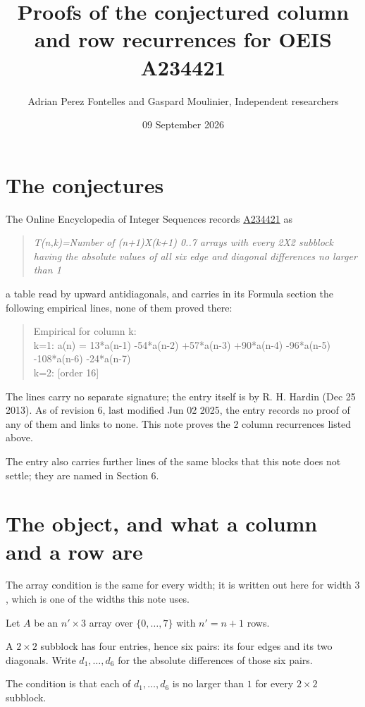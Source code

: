 \documentclass[11pt]{article}
\title{Proofs of the conjectured column and row recurrences for OEIS A234421}
\author{Adrian Perez Fontelles and Gaspard Moulinier, Independent researchers}
\date{09 September 2026}
\theoremstyle{definition}
\begin{document}
\maketitle
\section{The conjectures}

The Online Encyclopedia of Integer Sequences records \href{https://oeis.org/A234421}{A234421} as

\begin{quote}\itshape T(n,k)=Number of (n+1)X(k+1) 0..7 arrays with every 2X2 subblock having the absolute values of all six edge and diagonal differences no larger than 1\end{quote}

a table read by upward antidiagonals, and carries in its Formula section the following empirical lines, none of them proved there:

\begin{quote}\ttfamily Empirical for column k:\\
k=1: a(n) = 13*a(n-1) -54*a(n-2) +57*a(n-3) +90*a(n-4) -96*a(n-5) -108*a(n-6) -24*a(n-7)\\k=2: [order 16]\end{quote}

The lines carry no separate signature; the entry itself is by R. H. Hardin (Dec 25 2013). As of revision 6, last modified Jun 02 2025, the entry records no proof of any of them and links to none. This note proves the 2 column recurrences listed above.

The entry also carries further lines of the same blocks that this note does not settle; they are named in Section 6.

\section{The object, and what a column and a row are}

The array condition is the same for every width; it is written out here for width $3$, which is one of the widths this note uses.

Let $A$ be an $n' \times 3$ array over $\{0,\dots,7\}$ with $n' = n + 1$ rows.

A $2\times2$ subblock has four entries, hence six pairs: its four edges and its two diagonals. Write $d_1,\dots,d_6$ for the absolute differences of those six pairs.

The condition is that each of $d_1,\dots,d_6$ is no larger than $1$ for every $2\times2$ subblock.
\end{document}
